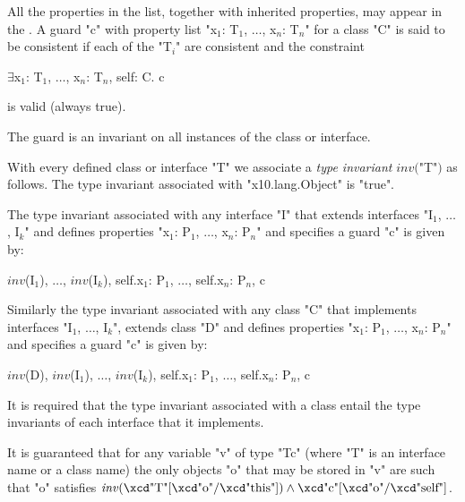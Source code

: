 All the properties in the list, together with inherited properties,
may appear in the . A guard \xcd"c" with
property list \xcdmath"x$_1$: T$_1$, $\dots$, x$_n$: T$_n$"
for a class \xcd"C" is said to be consistent if each of the \xcdmath"T$_i$" are
consistent and the constraint
\begin{xtenmath}
$\exists$x$_1$: T$_1$, $\dots$, x$_n$: T$_n$, self: C. c
\end{xtenmath}
\noindent is valid (always true).

\label{DepType:TypeInvariant}
\label{DepType:ClassGuardDef}

The guard is an invariant on all instances of the class or interface.

With every defined class or interface \xcd"T" we associate a {\em type
invariant} $\mathit{inv}($\xcd"T"$)$ as follows. The type
invariant associated with \xcd"x10.lang.Object" is 
\xcd"true".

The type invariant associated with any interface \xcd"I" that extends
interfaces \xcdmath"I$_1$, $\dots$, I$_k$" and defines properties
\xcdmath"x$_1$: P$_1$, $\dots$, x$_n$: P$_n$" and
specifies a guard \xcd"c" is given by:

\begin{xtenmath}
$\mathit{inv}$(I$_1$), $\dots$, $\mathit{inv}$(I$_k$),
    self.x$_1$: P$_1$,  $\dots$,  self.x$_n$: P$_n$, c  
\end{xtenmath}

Similarly the type invariant associated with any class \xcd"C" that
implements interfaces \xcdmath"I$_1$, $\dots$, I$_k$",
extends class \xcd"D" and defines properties
\xcdmath"x$_1$: P$_1$, $\dots$, x$_n$: P$_n$" and
specifies a guard \xcd"c" is
given by:
\begin{xtenmath}
$\mathit{inv}$(D), $\mathit{inv}$(I$_1$),  $\dots$, $\mathit{inv}$(I$_k$),
    self.x$_1$: P$_1$,  $\dots$, self.x$_n$: P$_n$,  c  
\end{xtenmath}

It is required that the type invariant associated with a class entail
the type invariants of each interface that it implements.

It is guaranteed that for any variable \xcd"v" of
type \xcd"T{c}" (where \xcd"T" is an interface name or a class name) the only
objects \xcd"o" that may be stored in \xcd"v" are such that \xcd"o" satisfies
$\mathit{inv}(\mbox{\xcd"T"}[\mbox{\xcd"o"}/\mbox{\xcd"this"}])
\wedge \mbox{\xcd"c"}[\mbox{\xcd"o"}/\mbox{\xcd"self"}]$.

